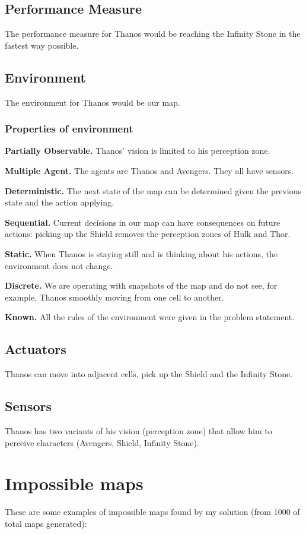 \documentclass{article}
\begin{document}
\subsection{Performance Measure}
The performance measure for Thanos would be reaching the Infinity Stone in the fastest way possible.
\subsection{Environment}
The environment for Thanos would be our map.
\subsubsection{Properties of environment}
\textbf{Partially Observable.} Thanos' vision is limited to his perception zone.

\textbf{Multiple Agent.} The agents are Thanos and Avengers. They all have sensors.

\textbf{Deterministic.} The next state of the map can be determined given the previous state and the action applying.

\textbf{Sequential.} Current decisions in our map can have consequences on future actions: picking up the Shield removes the perception zones of Hulk and Thor.

\textbf{Static.} When Thanos is staying still and is thinking about his actions, the environment does not change.

\textbf{Discrete.} We are operating with snapshots of the map and do not see, for example, Thanos smoothly moving from one cell to another.

\textbf{Known.} All the rules of the environment were given in the problem statement.
\subsection{Actuators}
Thanos can move into adjacent cells, pick up the Shield and the Infinity Stone.
\subsection{Sensors}
Thanos has two variants of his vision (perception zone) that allow him to perceive characters (Avengers, Shield, Infinity Stone).

\section{Impossible maps}
These are some examples of impossible maps found by my solution (from 1000 of total maps generated):
\end{document}
